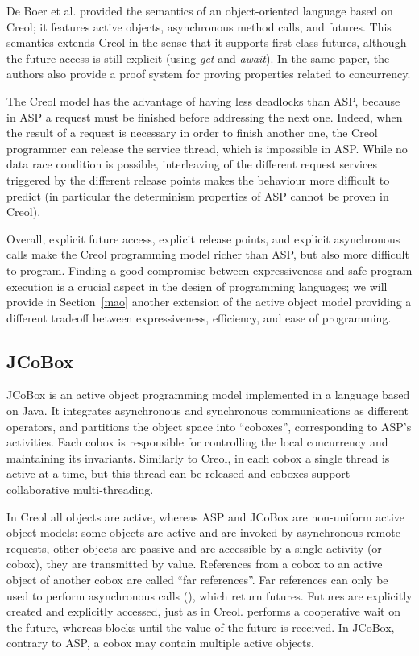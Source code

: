 De Boer et al.   \cite{SDE:BoerCJ07}  provided 
the semantics of an
object-oriented language based on Creol; it features
active objects, asynchronous method calls, and futures. This semantics
extends Creol in the sense that it
supports first-class futures, although the future access is  still
explicit (using \emph{get} and \emph{await}). 
In the same paper, the authors also provide a proof system for proving properties
related to concurrency. 

The Creol model has the advantage of having less deadlocks than ASP,
because in ASP a request must be finished before addressing the next one.
Indeed, when the result of a request is necessary in order to finish another
one, the Creol programmer can release the service thread, which is 
impossible in ASP.  While no data race
condition is possible, interleaving of the different request
services triggered by the different release points makes the behaviour
more difficult to predict (in particular the determinism properties of
ASP cannot be proven in Creol).


\smallskip

Overall, explicit future access,
explicit release points, and explicit asynchronous calls make the Creol
programming model richer than ASP, but also more difficult to program.
Finding a good compromise between expressiveness and safe program
execution is a crucial aspect in the design of programming
languages;  we will provide in
Section~\ref{mao} another extension of the active object model
providing a different tradeoff between expressiveness, efficiency, and
ease of programming.



\subsection{JCoBox}
JCoBox \cite{schafer2010jcobox} is an active object programming model
implemented in a language based on Java.  It integrates asynchronous
and synchronous communications as different operators, and partitions the
object space into ``coboxes'', corresponding to ASP's
activities. Each cobox is responsible for controlling the local
concurrency and maintaining its invariants. 
Similarly to Creol, in each cobox a single thread is active at a time, but this thread can be released and coboxes
support collaborative multi-threading.


In Creol \cite{Johnsen2006a} all objects are active, whereas ASP
and JCoBox are non-uniform active object models: some objects are active and are invoked by asynchronous
remote requests, other objects are passive and are accessible by a
single activity (or cobox), they are transmitted by value.  References
from a cobox to an active object of another cobox are called ``far
references''. Far references can only be used to perform asynchronous
calls (), which return futures.  Futures are
explicitly created and explicitly accessed, just as in Creol.
 performs a cooperative wait on the future, whereas
 blocks until the value of the future is received.  In
JCoBox, contrary to ASP, a cobox may contain multiple active objects.

